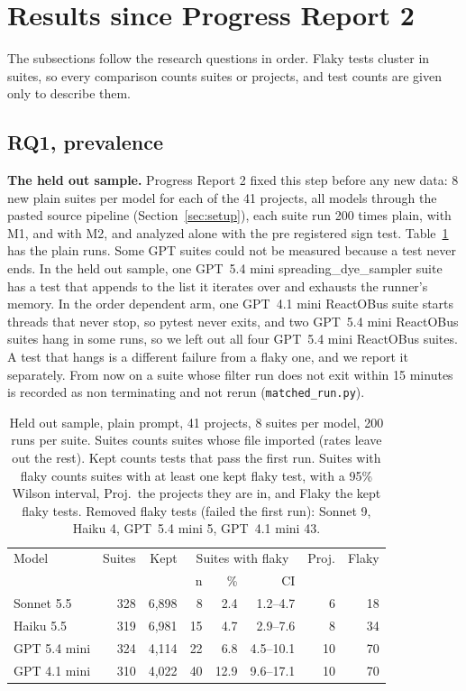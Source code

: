 \section{Results since Progress Report 2}
\label{sec:results}
The subsections follow the research questions in order. Flaky tests cluster in suites, so every comparison counts suites or projects, and test counts are given only to describe them.

\subsection{RQ1, prevalence}
\label{sec:heldout}
\textbf{The held out sample.} Progress Report 2 fixed this step before any new data: 8 new plain suites per model for each of the 41 projects, all models through the pasted source pipeline (Section~\ref{sec:setup}), each suite run 200 times plain, with M1, and with M2, and analyzed alone with the pre registered sign test. Table~\ref{tab:heldout} has the plain runs. Some GPT suites could not be measured because a test never ends. In the held out sample, one GPT~5.4 mini spreading\_dye\_sampler suite has a test that appends to the list it iterates over and exhausts the runner's memory. In the order dependent arm, one GPT~4.1 mini ReactOBus suite starts threads that never stop, so pytest never exits, and two GPT~5.4 mini ReactOBus suites hang in some runs, so we left out all four GPT~5.4 mini ReactOBus suites. A test that hangs is a different failure from a flaky one, and we report it separately. From now on a suite whose filter run does not exit within 15 minutes is recorded as non terminating and not rerun (\texttt{matched\_run.py}).

\begin{table}[htbp]
\caption{Held out sample, plain prompt, 41 projects, 8 suites per model, 200 runs per suite. Suites counts suites whose file imported (rates leave out the rest). Kept counts tests that pass the first run. Suites with flaky counts suites with at least one kept flaky test, with a 95\% Wilson interval, Proj.\ the projects they are in, and Flaky the kept flaky tests. Removed flaky tests (failed the first run): Sonnet 9, Haiku 4, GPT~5.4 mini 5, GPT~4.1 mini 43.}
\label{tab:heldout}
\small
\setlength{\tabcolsep}{2.5pt}
\begin{tabularx}{\columnwidth}{Xrrrrrrr}
\toprule
Model & Suites & Kept & \multicolumn{3}{c}{Suites with flaky} & Proj. & Flaky \\
 & & & n & \% & CI & & \\
\midrule
Sonnet 5.5 & 328 & 6,898 & 8 & 2.4 & 1.2--4.7 & 6 & 18 \\
Haiku 5.5 & 319 & 6,981 & 15 & 4.7 & 2.9--7.6 & 8 & 34 \\
GPT 5.4 mini & 324 & 4,114 & 22 & 6.8 & 4.5--10.1 & 10 & 70 \\
GPT 4.1 mini & 310 & 4,022 & 40 & 12.9 & 9.6--17.1 & 10 & 70 \\
\bottomrule
\end{tabularx}
\end{table}

